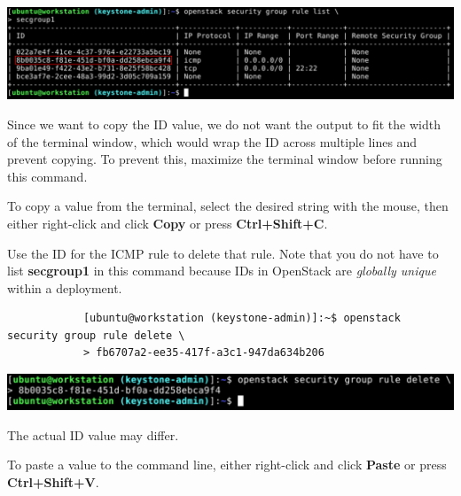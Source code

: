 \documentclass[letterpaper, 12pt]{article}
\begin{document}
\begin{enumerate}
\begin{labstep}
        \begin{center}
            \includegraphics[width=\linewidth]{images/part5/step11.png}
        \end{center}
    \end{labstep}

    \begin{tipbox}
        Since we want to copy the ID value, we do not want the output to fit the width of the terminal window, which would wrap the ID across multiple lines and prevent copying.
        To prevent this, maximize the terminal window before running this command.
    \end{tipbox}
    \begin{tipbox}
        To copy a value from the terminal, select the desired string with the mouse, then either right-click and click \textbf{Copy} or press \textbf{Ctrl+Shift+C}.
    \end{tipbox}

    \begin{labstep}
        Use the ID for the ICMP rule to delete that rule.
        Note that you do not have to list \textbf{secgroup1} in this command because IDs in OpenStack are \textit{globally unique} within a deployment.
        \begin{lstlisting}
            [ubuntu@workstation (keystone-admin)]:~$ openstack security group rule delete \
            > fb6707a2-ee35-417f-a3c1-947da634b206
        \end{lstlisting}

        \begin{center}
            \includegraphics[width=\linewidth]{images/part5/step12.png}
        \end{center}
    \end{labstep}

    \begin{notebox}
        The actual ID value may differ.
    \end{notebox}
    \begin{tipbox}
        To paste a value to the command line, either right-click and click \textbf{Paste} or press \textbf{Ctrl+Shift+V}.
    \end{tipbox}


\end{enumerate}
\end{document}
